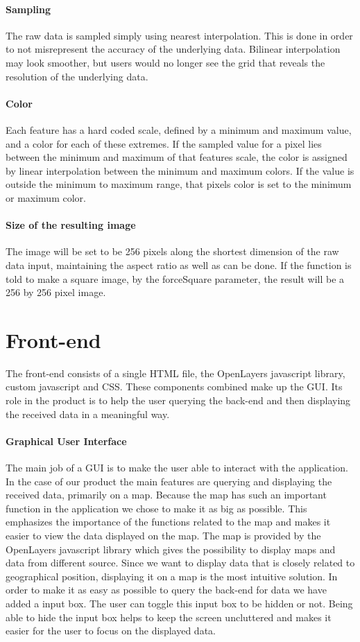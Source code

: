 \documentclass[11pt,a4paper,titlepage,oneside]{report}
\begin{document}
\paragraph{Sampling}
The raw data is sampled simply using nearest interpolation. This is done in order to not misrepresent the accuracy of the underlying data. Bilinear interpolation may look smoother, but users would no longer see the grid that reveals the resolution of the underlying data.
\paragraph{Color}
Each feature has a hard coded scale, defined by a minimum and maximum value, and a color for each of these extremes. If the sampled value for a pixel lies between the minimum and maximum of that features scale, the color is assigned by linear interpolation between the minimum and maximum colors. If the value is outside the minimum to maximum range, that pixels color is set to the minimum or maximum color.
\paragraph{Size of the resulting image}
The image will be set to be 256 pixels along the shortest dimension of the raw data input, maintaining the aspect ratio as well as can be done. If the function is told to make a square image, by the forceSquare parameter, the result will be a 256 by 256 pixel image.

\section{Front-end}
The \gls{front-end} consists of a single \gls{HTML} file, the OpenLayers javascript library, custom javascript and \gls{CSS}. These components combined make up the \gls{GUI}. Its role in the product is to help the user querying the \gls{back-end} and then displaying the received data in a meaningful way. 

\paragraph{Graphical User Interface}
The main job of a \gls{GUI} is to make the user able to interact with the application. In the case of our product the main features are querying and displaying the received data, primarily on a map. Because the map has such an important function in the application we chose to make it as big as possible. This emphasizes the importance of the functions related to the map and makes it easier to view the data displayed on the map. The map is provided by the OpenLayers javascript library which gives the possibility to display maps and data from different source. Since we want to display data that is closely related to geographical position, displaying it on a map is the most intuitive solution. In order to make it as easy as possible to query the \gls{back-end} for data we have added a input box. The user can toggle this input box to be hidden or not. Being able to hide the input box helps to keep the screen uncluttered and makes it easier for the user to focus on the displayed data.
\end{document}
